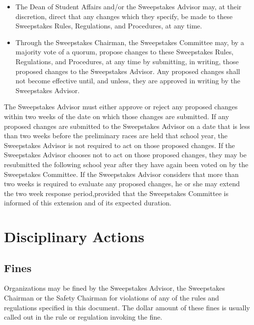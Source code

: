 	\begin{itemize}

		\item
		The Dean of Student Affairs and/or the Sweepstakes Advisor may, at their
		discretion, direct that any changes which they specify, be made to these
		Sweepstakes Rules, Regulations, and Procedures, at any time.

		\item
		Through the Sweepstakes Chairman, the Sweepstakes Committee may, by a majority
		vote of a quorum, propose changes to these Sweepstakes Rules, Regulations, and
		Procedures, at any time by submitting, in writing, those proposed changes to
		the Sweepstakes Advisor. Any proposed changes shall not become effective until,
		and unless, they are approved in writing by the Sweepstakes Advisor.

	\end{itemize}

	The Sweepstakes Advisor must either approve or reject any proposed changes within two
	weeks of the date on which those changes are submitted. If any proposed changes
	are submitted to the Sweepstakes Advisor on a date that is less than two weeks before the
	preliminary races are held that school year, the Sweepstakes Advisor is not required to
	act on those proposed changes. If the Sweepstakes Advisor chooses not to act on those
	proposed changes, they may be resubmitted the following school year after they
	have again been voted on by the Sweepstakes Committee. If the Sweepstakes Advisor
	considers that more than two weeks is required to evaluate any proposed
	changes, he or she may extend the two week response period,provided that the
	Sweepstakes Committee is informed of this extension and of its expected
	duration.

\section{Disciplinary Actions}

\subsection{Fines}

	Organizations may be fined by the Sweepstakes Advisor, the Sweepstakes Chairman
	or the Safety Chairman for violations of any of the rules and regulations
	specified in this document. The dollar amount of these fines is usually called
	out in the rule or regulation invoking the fine.

